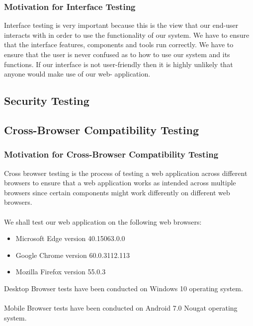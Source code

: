 \documentclass{article}
\begin{document}
\subsubsection{Motivation for Interface Testing} 
Interface testing is very important because this is the view that our end-user interacts with in order to use the functionality of our system. We have to ensure that the interface features, components and tools run correctly. We have to ensure that the user is never confused as to how to use our system and its functions. If our interface is not user-friendly then it is highly unlikely that anyone would make use of our web-
application.
\subsection{Security Testing}
\subsection{Cross-Browser Compatibility Testing}
\subsubsection{Motivation for Cross-Browser Compatibility Testing} 
Cross browser testing is the process of testing a web application across different browsers to ensure that a web application works as intended across multiple browsers since certain components might work differently on different web browsers. \\ \\
We shall test our web application on the following web browsers: \\ 
\begin{itemize}
\item Microsoft Edge version 40.15063.0.0
\item Google Chrome version 60.0.3112.113
\item Mozilla Firefox version 55.0.3 
\end{itemize}
Desktop Browser tests have been conducted on Windows 10 operating system. \\ \\
Mobile Browser tests have been conducted on Android 7.0 Nougat operating system. 
\end{document}
